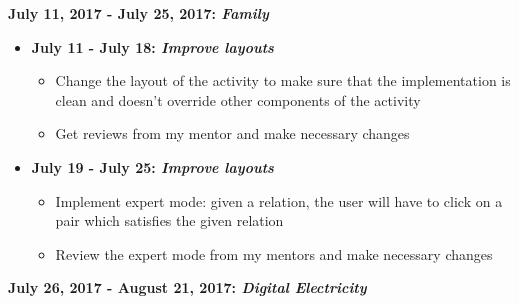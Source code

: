 \documentclass[preprint,12pt]{elsarticle}
\begin{document}
\textbf{July 11, 2017 - July 25, 2017: \textit{Family}}
\begin{itemize}

\item \textbf{July 11 - July 18: \textit{Improve layouts}}
\begin{itemize}
\item Change the layout of the activity to make sure that the implementation is clean and doesn't override other components of the activity
\item Get reviews from my mentor and make necessary changes
\end{itemize}

\item \textbf{July 19 - July 25: \textit{Improve layouts}}
\begin{itemize}
\item Implement expert mode: given a relation, the user will have to click on a pair which satisfies the given relation
\item Review the expert mode from my mentors and make necessary changes
\end{itemize}

\end{itemize}

\textbf{July 26, 2017 - August 21, 2017: \textit{Digital Electricity}}
\end{document}
